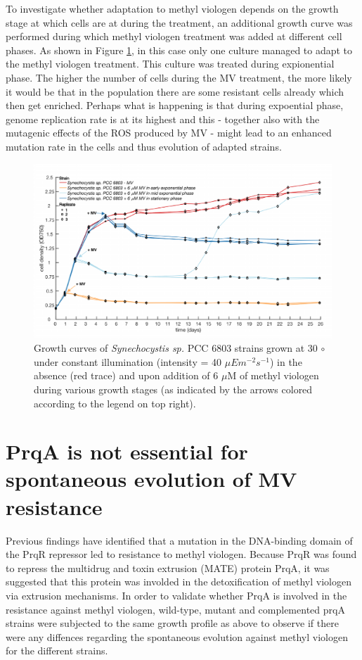 \documentclass[12pt]{article}
\begin{document}
To investigate whether adaptation to methyl viologen depends on the growth stage at which cells are at during the treatment, an additional growth curve was performed during which methyl viologen treatment was added at different cell phases. 
As shown in Figure \ref{fig:MVgrowthstages}, in this case only one culture  managed to adapt to the methyl viologen treatment. This culture was treated during expionential phase.  
The higher the number of cells during the MV treatment, the more likely it would be that in the population there are some resistant cells already which then get enriched. Perhaps what is happening is that during expoential phase, genome replication rate is at its highest and this - together also with the mutagenic effects of the ROS produced by MV - might lead to an enhanced mutation rate in the cells and thus evolution of adapted strains.

\begin{figure}[H]
    \centering
    \includegraphics[width=\hsize]{../Figures/MV_adaptation/growthcurves_growthstages_Howe.pdf}
    \caption{Growth curves of \textit{Synechocystis sp.} PCC 6803 strains grown at 30 $\circ$ under constant illumination (intensity = 40 $\mu Em^{-2}s^{-1}$) in the absence (red trace) and upon addition  of 6 $\mu$M of methyl viologen during various growth stages (as indicated by the arrows colored according to the legend on top right).}
    \label{fig:MVgrowthstages}
\end{figure}


\section{PrqA is not essential for spontaneous evolution of MV resistance}

Previous findings have identified that a mutation in the DNA-binding domain of the PrqR repressor led to resistance to methyl viologen. Because PrqR was found to repress the multidrug and toxin extrusion (MATE) protein PrqA, it was suggested that this protein was involded in the detoxification of methyl viologen via extrusion mechanisms. In order to validate whether PrqA is involved in the resistance against methyl viologen, wild-type, mutant and complemented prqA strains were subjected to the same growth profile as above to observe if there were any diffences regarding the spontaneous evolution against methyl viologen for the different strains. 
\end{document}
